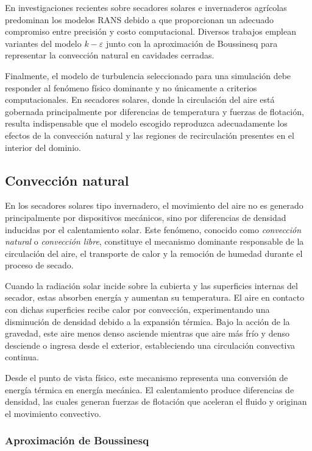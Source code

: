 En investigaciones recientes sobre secadores solares e invernaderos agrícolas predominan los modelos RANS debido a que proporcionan un adecuado compromiso entre precisión y costo computacional. Diversos trabajos emplean variantes del modelo $k-\varepsilon$ junto con la aproximación de Boussinesq para representar la convección natural en cavidades cerradas. 

Finalmente, el modelo de turbulencia seleccionado para una simulación debe responder al fenómeno físico dominante y no únicamente a criterios computacionales. En secadores solares, donde la circulación del aire está gobernada principalmente por diferencias de temperatura y fuerzas de flotación, resulta indispensable que el modelo escogido reproduzca adecuadamente los efectos de la convección natural y las regiones de recirculación presentes en el interior del dominio.

\subsection{Convección natural}

En los secadores solares tipo invernadero, el movimiento del aire no es generado principalmente por dispositivos mecánicos, sino por diferencias de densidad inducidas por el calentamiento solar. Este fenómeno, conocido como \textit{convección natural} o \textit{convección libre}, constituye el mecanismo dominante responsable de la circulación del aire, el transporte de calor y la remoción de humedad durante el proceso de secado.

Cuando la radiación solar incide sobre la cubierta y las superficies internas del secador, estas absorben energía y aumentan su temperatura. El aire en contacto con dichas superficies recibe calor por convección, experimentando una disminución de densidad debido a la expansión térmica. Bajo la acción de la gravedad, este aire menos denso asciende mientras que aire más frío y denso desciende o ingresa desde el exterior, estableciendo una circulación convectiva continua.

Desde el punto de vista físico, este mecanismo representa una conversión de energía térmica en energía mecánica. El calentamiento produce diferencias de densidad, las cuales generan fuerzas de flotación que aceleran el fluido y originan el movimiento convectivo.

\subsubsection{Aproximación de Boussinesq}

